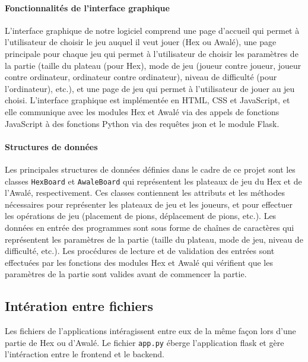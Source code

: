 \paragraph{Fonctionnalités de l'interface graphique}
L'interface graphique de notre logiciel comprend une page d'accueil qui permet à l'utilisateur
de choisir le jeu auquel il veut jouer (Hex ou Awalé), une page principale pour chaque jeu
qui permet à l'utilisateur de choisir les paramètres de la partie (taille du plateau (pour Hex),
mode de jeu (joueur contre joueur, joueur contre ordinateur, ordinateur contre ordinateur),
niveau de difficulté (pour l'ordinateur), etc.), et une page de jeu qui permet à l'utilisateur
de jouer au jeu choisi. L'interface graphique est implémentée en HTML, CSS et JavaScript, et
elle communique avec les modules Hex et Awalé via des appels de fonctions JavaScript à des
fonctions Python via des requêtes json et le module Flask.

\paragraph{Structures de données}
Les principales structures de données définies dans le cadre de ce projet sont les classes
\texttt{HexBoard} et \texttt{AwaleBoard} qui représentent les plateaux de jeu du Hex et de
l'Awalé, respectivement. Ces classes contiennent les attributs et les méthodes nécessaires
pour représenter les plateaux de jeu et les joueurs, et pour effectuer les opérations de jeu
(placement de pions, déplacement de pions, etc.). Les données en entrée des programmes sont
sous forme de chaînes de caractères qui représentent les paramètres de la partie (taille du
plateau, mode de jeu, niveau de difficulté, etc.). Les procédures de lecture et de validation
des entrées sont effectuées par les fonctions des modules Hex et Awalé qui vérifient que les
paramètres de la partie sont valides avant de commencer la partie.

\subsection{Intération entre fichiers}
Les fichiers de l'applications intéragissent entre eux de la même façon lors d'une partie de Hex ou 
d'Awalé. Le fichier \texttt{app.py} éberge l'application flask et gère l'intéraction entre le frontend et le 
backend.

